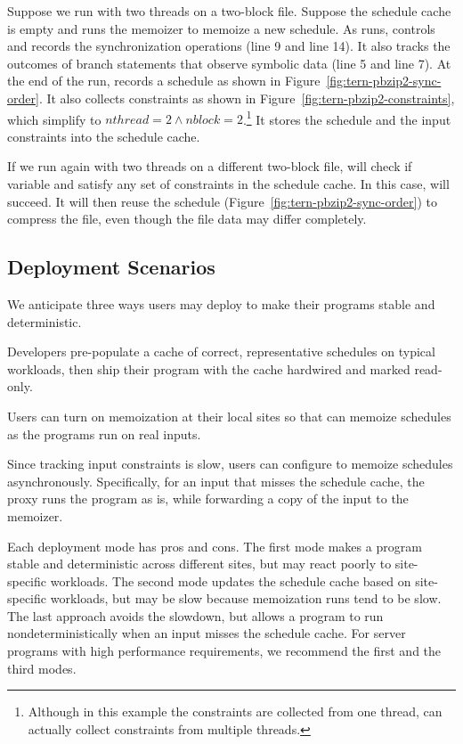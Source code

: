 Suppose we run \pbzip with two threads on a two-block file.  Suppose the
schedule cache is empty and \tern runs the memoizer to memoize a new
schedule.  As \pbzip runs, \tern controls and records the synchronization
operations (line 9 and line 14).  It also tracks the outcomes of branch
statements that observe symbolic data (line 5 and line 7).  At the end of the
run, \tern records a schedule as shown in
Figure~\ref{fig:tern-pbzip2-sync-order}.  It also collects constraints as shown
in Figure~\ref{fig:tern-pbzip2-constraints}, which simplify to $nthread=2
\wedge nblock=2$.\footnote{Although in this example the constraints are
  collected from one thread, \tern can actually collect constraints from
  multiple threads.}  It stores the schedule and the input constraints
into the schedule cache.

If we run \pbzip again with two threads on a different two-block file,
\tern will check if variable  and  satisfy any set of
constraints in the schedule cache.  In this case, \tern will succeed.  It
will then reuse the schedule (Figure~\ref{fig:tern-pbzip2-sync-order}) to
compress the file, even though the file data may differ completely.


\subsection{Deployment Scenarios} \label{sec:tern-offline}

We anticipate three ways users may deploy \tern to make their programs
stable and deterministic.

 Developers pre-populate a cache of correct,
representative schedules on typical workloads, then ship their program
with the cache hardwired and marked read-only.

  Users can turn on memoization at their local
sites so that \tern can memoize schedules as the programs run on real
inputs.

 Since tracking input constraints is slow, users
can configure \tern to memoize schedules asynchronously.  Specifically, for
an input that misses the schedule cache, the proxy runs the program as is,
while forwarding a copy of the input to the memoizer.

\para{} Each deployment mode has pros and cons.  The first mode makes a
program stable and deterministic across different sites, but may react
poorly to site-specific workloads.  The second mode updates the schedule
cache based on site-specific workloads, but may be slow because
memoization runs tend to be slow.  The last approach avoids the slowdown,
but allows a program to run nondeterministically when an input misses the
schedule cache.  For server programs with high performance requirements,
we recommend the first and the third modes.

